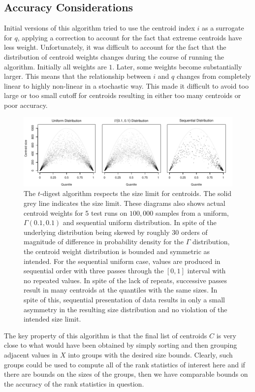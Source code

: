 \documentclass[11pt]{amsart}
\begin{document}
\subsection{Accuracy Considerations}
Initial versions of this algorithm tried to use the centroid index $i$ as a surrogate for $q$, applying a correction to account for the fact that extreme centroids have less weight.  Unfortunately, it was difficult to account for the fact that the distribution of centroid weights changes during the course of running the algorithm.  Initially all weights are $1$.  Later, some weights become substantially larger.  This means that the relationship between $i$ and $q$ changes from completely linear to highly non-linear in a stochastic way.  This made it difficult to avoid too large or too small cutoff for centroids resulting in either too many centroids or poor accuracy.
\begin{figure}[htb] %
   \centering
   \includegraphics[width=6in]{sizes.pdf} 
   \caption{The $t$-digest algorithm respects the size limit for centroids.  The solid grey line indicates the size limit.  These diagrams also shows actual centroid weights for 5 test runs on $100,000$ samples from a uniform, $\Gamma(0.1, 0.1)$ and sequential uniform distribution.  In spite of the underlying distribution being skewed by roughly $30$ orders of magnitude of difference in probability density for the $\Gamma$ distribution, the centroid weight distribution is bounded and symmetric as intended.  For the sequential uniform case, values are produced in sequential order with three passes through the $[0,1]$ interval with no repeated values.  In spite of the lack of repeats, successive passes result in many centroids at the quantiles with the same sizes.  In spite of this, sequential presentation of data results in only a small asymmetry in the resulting size distribution and no violation of the intended size limit.}
   \label{fig:gamma-sizes}
\end{figure}

The key property of this algorithm is that the final list of centroids $C$ is very close to what would have been obtained by simply sorting and then grouping adjacent values in $X$ into groups with the desired size bounds.  Clearly, such groups could be used to compute all of the rank statistics of interest here and if there are bounds on the sizes of the groups, then we have comparable bounds on the accuracy of the rank statistics in question.
\end{document}
